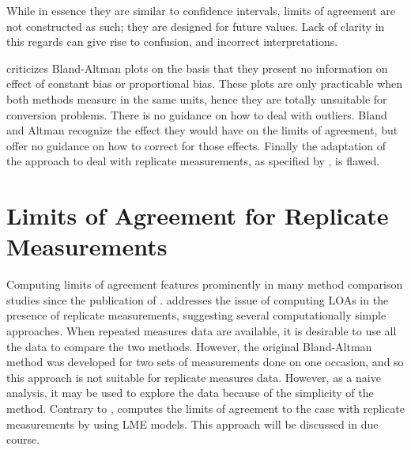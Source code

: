 \documentclass[12pt, a4paper]{report}
\theoremstyle{plain}
\theoremstyle{definition}
\theoremstyle{remark}
\begin{document}
While in essence they are similar to confidence intervals, limits of agreement are not constructed as such; they are designed for future values. Lack of clarity in this regards can give rise to confusion, and incorrect interpretations.

\citet{ludbrook97,ludbrook02} criticizes Bland-Altman plots on the basis that they present no information on effect of constant bias or proportional bias. These plots are only practicable when both methods measure in the same units, hence they are totally
unsuitable for conversion problems. There is no guidance on how to deal with outliers. Bland and Altman recognize the effect they would have on the limits of agreement, but offer no guidance on how to correct for those effects. Finally the adaptation of the approach to deal with replicate measurements, as specified by \citet{BA99}, is flawed.

\section{Limits of Agreement for Replicate Measurements}

Computing limits of agreement features prominently in many method comparison studies since the publication of \citet{BA86}.
\citet{BA99} addresses the issue of computing LOAs in the presence of replicate measurements, suggesting several computationally simple approaches. When repeated measures data are available, it is desirable to use
all the data to compare the two methods. However, the original Bland-Altman method was developed for two sets of measurements done on one occasion, and so this approach is not suitable for replicate measures data. However, as a naive analysis, it may be used to explore the data because of the simplicity of the method.
Contrary to \citet{BA99}, \citet{BXC2008} computes the limits of agreement to the case with replicate measurements by using LME models. This approach will be discussed in due course.





	
\end{document}
